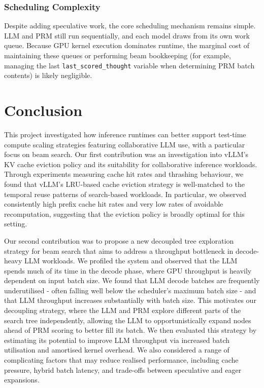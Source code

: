 \documentclass[12pt,twoside]{report}
\begin{document}

\subsection{Scheduling Complexity}
Despite adding speculative work, the core scheduling mechanism remains simple. 
LLM and PRM still run sequentially, and each model draws from its own work queue. 
Because GPU kernel execution dominates runtime, the marginal cost of maintaining these queues or performing beam bookkeeping (for example, managing the last \texttt{last\_scored\_thought} variable when determining PRM batch contents) is likely negligible. 


\chapter{Conclusion}
This project investigated how inference runtimes can better support test-time compute scaling strategies featuring collaborative LLM use, with a particular focus on beam search.
Our first contribution was an investigation into vLLM’s KV cache eviction policy and its suitability for collaborative inference workloads.
Through experiments measuring cache hit rates and thrashing behaviour, we found that vLLM’s LRU-based cache eviction strategy is well-matched to the temporal reuse patterns of search-based workloads.
In particular, we observed consistently high prefix cache hit rates and very low rates of avoidable recomputation, suggesting that the eviction policy is broadly optimal for this setting.

Our second contribution was to propose a new decoupled tree exploration strategy for beam search that aims to address a throughput bottleneck in decode-heavy LLM workloads.
We profiled the system and observed that the LLM spends much of its time in the decode phase, where GPU throughput is heavily dependent on input batch size.
We found that LLM decode batches are frequently underutilised - often falling well below the scheduler's maximum batch size - and that LLM throughput increases substantially with batch size.
This motivates our decoupling strategy, where the LLM and PRM explore different parts of the search tree independently, allowing the LLM to opportunistically expand nodes ahead of PRM scoring to better fill its batch.
We then evaluated this strategy by estimating its potential to improve LLM throughput via increased batch utilisation and amortised kernel overhead.
We also considered a range of complicating factors that may reduce realised performance, including cache pressure, hybrid batch latency, and trade-offs between speculative and eager expansions.
\end{document}
